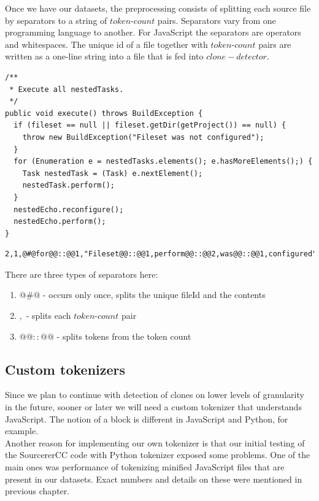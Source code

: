 \documentclass[thesis=M,english]{FITthesis}[2012/10/20]
\begin{document}
Once we have our datasets, the preprocessing consists of splitting each source file by separators to a string of $token$-$count$ pairs. Separators vary from one programming language to another. For JavaScript the separators are operators and whitespaces. The unique id of a file together with $token$-$count$ pairs are written as a one-line string into a file that is fed into $clone-detector$. \\

\lstset{title=Example code in Java}
\begin{lstlisting}[basicstyle=\tiny]
/**
 * Execute all nestedTasks.
 */
public void execute() throws BuildException {
  if (fileset == null || fileset.getDir(getProject()) == null) {
    throw new BuildException("Fileset was not configured");
  }
  for (Enumeration e = nestedTasks.elements(); e.hasMoreElements();) {
    Task nestedTask = (Task) e.nextElement();
    nestedTask.perform();
  }
  nestedEcho.reconfigure();
  nestedEcho.perform();
}
\end{lstlisting}

\lstset{title=Example output of a tokenizer for Java code, breaklines=true}
\begin{lstlisting}[basicstyle=\tiny]
2,1,@#@for@@::@@1,"Fileset@@::@@1,perform@@::@@2,was@@::@@1,configured"@@::@@1,throw@@::@@1,if@@::@@1,elements@@::@@1,null@@::@@2,nextElement@@::@@1,nestedTask@@::@@2,execute@@::@@1,e@@::@@3,nestedTasks@@::@@1,throws@@::@@1,getDir@@::@@1,void@@::@@1,Enumeration@@::@@1,nestedEcho@@::@@2,not@@::@@1,new@@::@@1,getProject@@::@@1,fileset@@::@@2,hasMoreElements@@::@@1,Task@@::@@2,public@@::@@1,reconfigure@@::@@1,BuildException@@::@@2
\end{lstlisting}


There are three types of separators here:

\begin{enumerate}
\item $@\#@$ - occurs only once, splits the unique fileId and the contents
\item $,$ - splits each $token$-$count$ pair
\item  $@@::@@$ - splits tokens from the token count
\end{enumerate}

\subsection{Custom tokenizers}

Since we plan to continue with detection of clones on lower levels of granularity in the future, sooner or later we will need a custom tokenizer that understands JavaScript. The notion of a block is different in JavaScript and Python, for example. \\  Another reason for implementing our own tokenizer is that our initial testing of the SourcererCC code with Python tokenizer exposed some problems. One of the main ones was performance of tokenizing minified JavaScript files that are present in our datasets. Exact numbers and details on these were mentioned in previous chapter. \\
\end{document}
